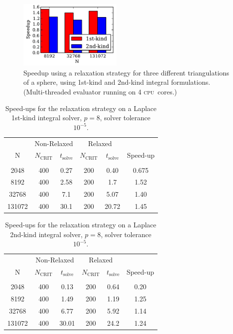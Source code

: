 \documentclass[final,leqno,]{siamltex1213}
\newcommand{\cpu}{\textsc{cpu}}
\newcommand{\ncrit}{N_{\text{CRIT}}}
\newcommand{\tsolve}{t_{\text{solve}}}
\begin{document}
\begin{figure}%
	\centering
	\includegraphics[natwidth=3in,natheight=2in,width=0.45\textwidth]{LaplaceSpeedupRelaxation.pdf}
	\caption{Speedup using a relaxation strategy for three different triangulations of a sphere, using 1st-kind and 2nd-kind integral formulations. (Multi-threaded evaluator running on 4 \cpu\ cores.)}
	\label{fig:relaxation_timing}
\end{figure}


\begin{table}[h]
\footnotesize
\begin{center}
\begin{tabular}{c|cc|cc|c}
  & \multicolumn{2}{c|}{Non-Relaxed} & \multicolumn{2}{c|}{Relaxed} & \\
  N & $\ncrit$ & $\tsolve$ & $\ncrit$ & $\tsolve$ & Speed-up \\
 \hline
   & & & & & \\
  2048 & 400 & 0.27 & 200 & 0.40 & 0.675 \\
  8192 & 400 & 2.58 & 200 & 1.7 & 1.52 \\
  32768  & 400 & 7.1 & 200 & 5.07 & 1.40 \\
  131072  & 400 & 30.1 & 200 & 20.72 & 1.45 \\
 
\end{tabular}
\end{center}
\caption{Speed-ups for the relaxation strategy on a Laplace 1st-kind integral solver, $p=8$, solver tolerance $10^{-5}$.}
\label{tab:laplace_1st_relaxation}
\end{table}%

\begin{table}[h]
\footnotesize
\begin{center}
\begin{tabular}{c|cc|cc|c}
  & \multicolumn{2}{c|}{Non-Relaxed} & \multicolumn{2}{c|}{Relaxed} & \\
  N & $\ncrit$ & $\tsolve$ & $\ncrit$ & $\tsolve$ & Speed-up \\
 \hline
   & & & & & \\
  2048 & 400 & 0.13 & 200 & 0.64 & 0.20 \\
  8192 & 400 & 1.49 & 200 & 1.19 & 1.25 \\
  32768 & 400 & 6.77 & 200 & 5.92 & 1.14 \\
  131072 & 400 & 30.01 & 200 & 24.2 & 1.24 \\
 
\end{tabular}
\end{center}
\caption{Speed-ups for the relaxation strategy on a Laplace 2nd-kind integral solver, $p=8$, solver tolerance  $10^{-5}$.}
\label{tab:laplace_2nd_relaxation}
\end{table}%
\end{document}
